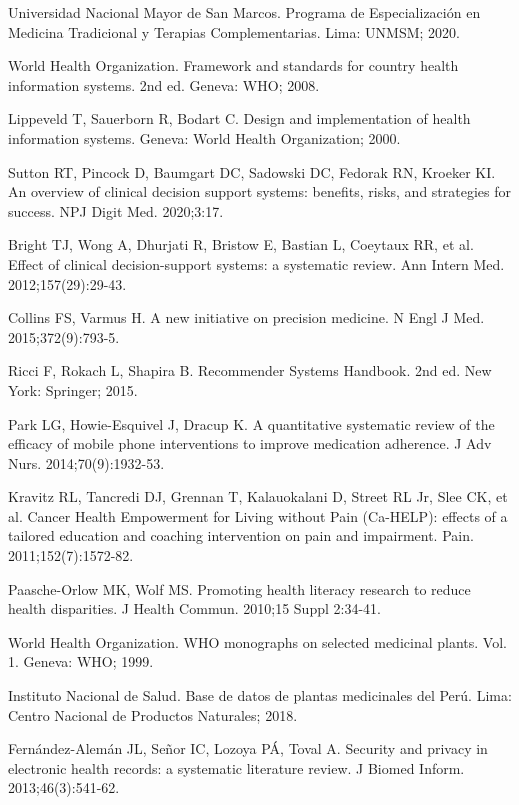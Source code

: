 \documentclass[12pt,a4paper]{article}
\begin{document}
\begin{thebibliography}{99}
Universidad Nacional Mayor de San Marcos. Programa de Especialización en Medicina Tradicional y Terapias Complementarias. Lima: UNMSM; 2020.

World Health Organization. Framework and standards for country health information systems. 2nd ed. Geneva: WHO; 2008.

Lippeveld T, Sauerborn R, Bodart C. Design and implementation of health information systems. Geneva: World Health Organization; 2000.

Sutton RT, Pincock D, Baumgart DC, Sadowski DC, Fedorak RN, Kroeker KI. An overview of clinical decision support systems: benefits, risks, and strategies for success. NPJ Digit Med. 2020;3:17.

Bright TJ, Wong A, Dhurjati R, Bristow E, Bastian L, Coeytaux RR, et al. Effect of clinical decision-support systems: a systematic review. Ann Intern Med. 2012;157(29):29-43.

Collins FS, Varmus H. A new initiative on precision medicine. N Engl J Med. 2015;372(9):793-5.

Ricci F, Rokach L, Shapira B. Recommender Systems Handbook. 2nd ed. New York: Springer; 2015.

Park LG, Howie-Esquivel J, Dracup K. A quantitative systematic review of the efficacy of mobile phone interventions to improve medication adherence. J Adv Nurs. 2014;70(9):1932-53.

Kravitz RL, Tancredi DJ, Grennan T, Kalauokalani D, Street RL Jr, Slee CK, et al. Cancer Health Empowerment for Living without Pain (Ca-HELP): effects of a tailored education and coaching intervention on pain and impairment. Pain. 2011;152(7):1572-82.

Paasche-Orlow MK, Wolf MS. Promoting health literacy research to reduce health disparities. J Health Commun. 2010;15 Suppl 2:34-41.

World Health Organization. WHO monographs on selected medicinal plants. Vol. 1. Geneva: WHO; 1999.

Instituto Nacional de Salud. Base de datos de plantas medicinales del Perú. Lima: Centro Nacional de Productos Naturales; 2018.

Fernández-Alemán JL, Señor IC, Lozoya PÁ, Toval A. Security and privacy in electronic health records: a systematic literature review. J Biomed Inform. 2013;46(3):541-62.


\end{thebibliography}
\end{document}
